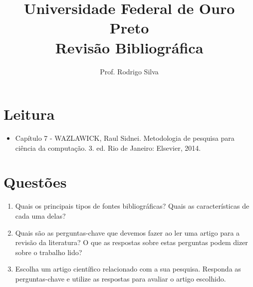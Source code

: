 \documentclass{article}
\title{\vspace{-2 cm}Universidade Federal de Ouro Preto \\ Revisão Bibliográfica}
\author{Prof. Rodrigo Silva}
\date{}
\begin{document}
\maketitle

\section{Leitura}

\begin{itemize}
    \item Capítulo 7 - WAZLAWICK, Raul Sidnei. Metodologia de pesquisa para ciência da computação. 3. ed. Rio de Janeiro: Elsevier, 2014.
\end{itemize}

\section{Questões}

\begin{enumerate}
\item Quais os principais tipos de fontes bibliográficas? Quais as características de cada uma delas?
\item Quais são as perguntas-chave que devemos fazer ao ler uma artigo para a revisão da literatura? O que as respostas sobre estas perguntas podem dizer sobre o trabalho lido?
\item Escolha um artigo científico relacionado com a sua pesquisa. Responda as perguntas-chave e utilize as respostas para avaliar o artigo escolhido. 
\end{enumerate}


%
%
\end{document}
